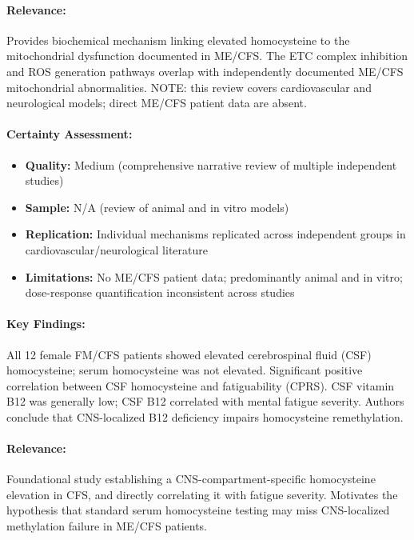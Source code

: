 \paragraph{Relevance:}
Provides biochemical mechanism linking elevated homocysteine to the mitochondrial dysfunction
documented in ME/CFS. The ETC complex inhibition and ROS generation pathways overlap with
independently documented ME/CFS mitochondrial abnormalities. NOTE: this review covers
cardiovascular and neurological models; direct ME/CFS patient data are absent.

\paragraph{Certainty Assessment:}
\begin{itemize}
  \item \textbf{Quality:} Medium (comprehensive narrative review of multiple independent studies)
  \item \textbf{Sample:} N/A (review of animal and in vitro models)
  \item \textbf{Replication:} Individual mechanisms replicated across independent groups in
    cardiovascular/neurological literature
  \item \textbf{Limitations:} No ME/CFS patient data; predominantly animal and in vitro;
    dose-response quantification inconsistent across studies
\end{itemize}

\bigskip


\paragraph{Key Findings:}
All 12 female FM/CFS patients showed elevated cerebrospinal fluid (CSF) homocysteine; serum
homocysteine was not elevated. Significant positive correlation between CSF homocysteine and
fatiguability (CPRS). CSF vitamin B12 was generally low; CSF B12 correlated with mental fatigue
severity. Authors conclude that CNS-localized B12 deficiency impairs homocysteine remethylation.

\paragraph{Relevance:}
Foundational study establishing a CNS-compartment-specific homocysteine elevation in CFS, and
directly correlating it with fatigue severity. Motivates the hypothesis that standard serum
homocysteine testing may miss CNS-localized methylation failure in ME/CFS patients.

